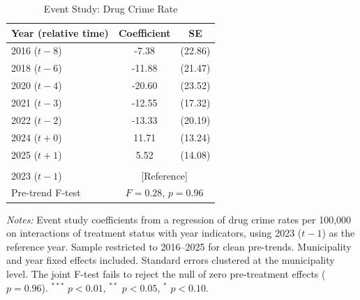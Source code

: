 \begin{table}[t]
\centering
\caption{Event Study: Drug Crime Rate}
\label{tab:eventstudy}
\begin{tabular}{lcc}
\hline\hline
Year (relative time) & Coefficient & SE \\
\hline
2016 ($t-8$) & -7.38 & (22.86) \\
2018 ($t-6$) & -11.88 & (21.47) \\
2020 ($t-4$) & -20.60 & (23.52) \\
2021 ($t-3$) & -12.55 & (17.32) \\
2022 ($t-2$) & -13.33 & (20.19) \\
2024 ($t+0$) & 11.71 & (13.24) \\
2025 ($t+1$) & 5.52 & (14.08) \\
 & & \\
2023 ($t-1$) & \multicolumn{2}{c}{[Reference]} \\
\hline
Pre-trend F-test & \multicolumn{2}{c}{$F = 0.28$, $p = 0.96$} \\
\hline\hline
\end{tabular}
\begin{tablenotes}
\item \textit{Notes:} Event study coefficients from a regression of drug crime rates per 100,000 on interactions of treatment status with year indicators, using 2023 ($t-1$) as the reference year. Sample restricted to 2016--2025 for clean pre-trends. Municipality and year fixed effects included. Standard errors clustered at the municipality level. The joint F-test fails to reject the null of zero pre-treatment effects ($p = 0.96$). $^{***}$ $p<0.01$, $^{**}$ $p<0.05$, $^{*}$ $p<0.10$.
\end{tablenotes}
\end{table}

